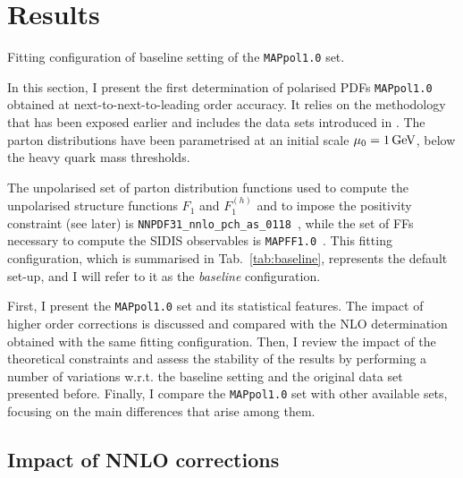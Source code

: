 \section{Results}
\label{sec:4.4}

\begin{table}[t]
  \centering 
  \small
  
  \caption{
    \small
    Fitting configuration of baseline setting of the \texttt{MAPpol1.0} set.
  \label{tab:baseline}}
\end{table}

In this section, I present the first determination of polarised PDFs \texttt{MAPpol1.0} obtained at next-to-next-to-leading order accuracy. It relies on the methodology that has been exposed earlier and includes the data sets introduced in . The parton distributions have been parametrised at an initial scale $\mu_0 = 1\,\textrm{GeV}$, below the heavy quark mass thresholds.%

The unpolarised set of parton distribution functions used to compute the unpolarised structure functions $F_1$ and $F_1^{(h)}$ and to impose the positivity constraint (see later) is \texttt{NNPDF31\_nnlo\_pch\_as\_0118}~\cite{NNPDF:2017mvq}, while the set of FFs necessary to compute the SIDIS observables is \texttt{MAPFF1.0}~\cite{Khalek:2021gxf, AbdulKhalek:2022laj}. This fitting configuration, which is summarised in Tab.~\ref{tab:baseline}, represents the default set-up, and I will refer to it as the \textit{baseline} configuration.%

First, I present the \texttt{MAPpol1.0} set and its statistical features. The impact of higher order corrections is discussed and compared with the NLO determination obtained with the same fitting configuration. Then, I review the impact of the theoretical constraints and assess the stability of the results by performing a number of variations w.r.t. the baseline setting and the original data set presented before. Finally, I compare the \texttt{MAPpol1.0} set with other available sets, focusing on the main differences that arise among them.

\subsection{Impact of NNLO corrections}
\label{sec:nnlo}

